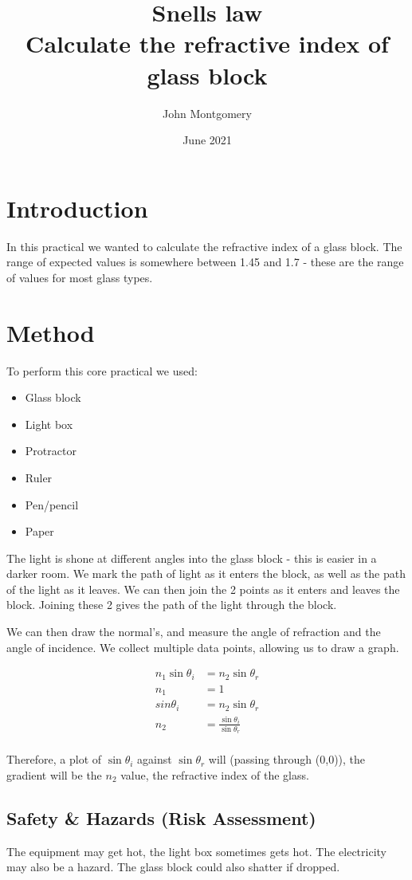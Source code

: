 \documentclass{article}
\author{John Montgomery }
\date{June 2021}
\title{
  Snells law \\
  \large Calculate the refractive index of glass block
  }
\begin{document}
\maketitle
\tableofcontents{}
\newpage
\section{Introduction}
In this practical we wanted to calculate the refractive index of a glass block. The range of expected values is somewhere between 1.45 and 1.7 - these are the range of values for most glass types.

\section{Method}
To perform this core practical we used:
\begin{itemize}
    \item Glass block
    \item Light box
    \item Protractor
    \item Ruler
    \item Pen/pencil
    \item Paper
    

\end{itemize}
The light is shone at different angles into the glass block - this is easier in a darker room. We mark the path of light as it enters the block, as well as the path of the light as it leaves. We can then join the 2 points as it enters and leaves the block. Joining these 2 gives the path of the light through the block.

We can then draw the normal's, and measure the angle of refraction and the angle of incidence. We collect multiple data points, allowing us to draw a graph.

\begin{align*}
    n_1\sin{\theta_i} &= n_2\sin{\theta_r}\\
    n_1 &= 1\\
    sin{\theta_i} &= n_2\sin{\theta_r}\\
     n_2 &=\frac{\sin{\theta_i}}{\sin{\theta_r}}\\
\end{align*}

Therefore, a plot of $\sin{\theta_i}$ against $\sin{\theta_r}$ will (passing through (0,0)), the gradient will be the $n_2$ value, the refractive index of the glass.

\subsection{Safety \& Hazards (Risk Assessment)}
The equipment may get hot, the light box sometimes gets hot. The electricity may also be a hazard. The glass block could also shatter if dropped.
\end{document}

